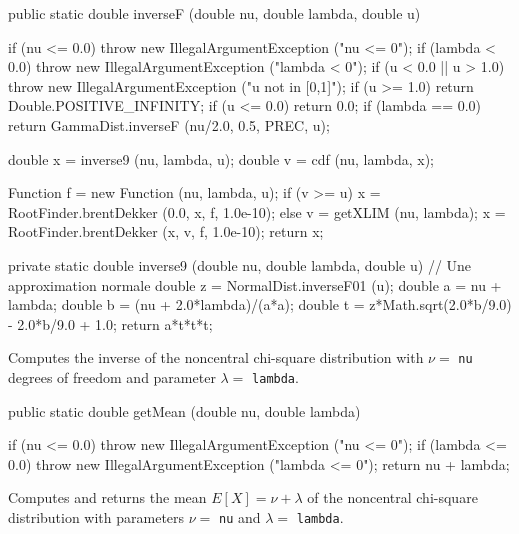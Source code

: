 \begin{code}

   public static double inverseF (double nu, double lambda, double u)\begin{hide} {
      if (nu <= 0.0)
         throw new IllegalArgumentException ("nu <= 0");
      if (lambda < 0.0)
         throw new IllegalArgumentException ("lambda < 0");
      if (u < 0.0 || u > 1.0)
         throw new IllegalArgumentException ("u not in [0,1]");
      if (u >= 1.0)
         return Double.POSITIVE_INFINITY;
      if (u <= 0.0)
         return 0.0;
      if (lambda == 0.0)
         return GammaDist.inverseF (nu/2.0, 0.5, PREC, u);

      double x = inverse9 (nu, lambda, u);
      double v = cdf (nu, lambda, x);

      Function f = new Function (nu, lambda, u);
      if (v >= u)
         x = RootFinder.brentDekker (0.0, x, f, 1.0e-10);
      else {
         v = getXLIM (nu, lambda);
         x = RootFinder.brentDekker (x, v, f, 1.0e-10);
      }
      return x;
   }

   private static double inverse9 (double nu, double lambda, double u) {
       // Une approximation normale \cite{tKRI06a}
       double z = NormalDist.inverseF01 (u);
       double a = nu + lambda;
       double b = (nu + 2.0*lambda)/(a*a);
       double t = z*Math.sqrt(2.0*b/9.0) - 2.0*b/9.0 + 1.0;
       return a*t*t*t;
   }\end{hide}
\end{code}
\begin{tabb}
 Computes the inverse of the noncentral chi-square distribution with $\nu = $
 \texttt{nu} degrees of freedom and parameter $\lambda = $ \texttt{lambda}.
\end{tabb}
\begin{code}

   public static double getMean (double nu, double lambda)\begin{hide} {
      if (nu <= 0.0)
         throw new IllegalArgumentException ("nu <= 0");
      if (lambda <= 0.0)
         throw new IllegalArgumentException ("lambda <= 0");
      return  nu + lambda;
   }\end{hide}
\end{code}
\begin{tabb}  Computes and returns the mean $E[X] = \nu + \lambda$ of the
   noncentral chi-square distribution with parameters $\nu = $
\texttt{nu} and $\lambda = $ \texttt{lambda}.
\end{tabb}
\begin{htmlonly}
\end{htmlonly}
